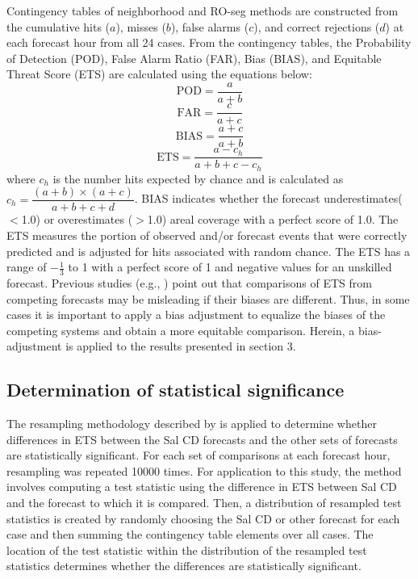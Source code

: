 \documentclass[12pt]{article}
\begin{document}
Contingency tables \citep{wilks11} of neighborhood and RO-seg methods are constructed from the cumulative hits ($a$), misses ($b$), false alarms ($c$), and correct rejections ($d$) at each forecast hour from all 24 cases. From the contingency tables, the Probability of Detection (POD), False Alarm Ratio (FAR), Bias (BIAS), and Equitable Threat Score (ETS) are calculated using the equations below:
\begin{equation}
\text{POD}=\frac{a}{a+b}
\end{equation}
\noindent
\begin{equation}
\text{FAR}=\frac{c}{a+c}
\end{equation}
\begin{equation}
\text{BIAS}=\frac{a+c}{a+b}
\end{equation}
\begin{equation}
\text{ETS}=\frac{a-c_{h}}{a+b+c-c_{h}}
\label{eETS}
\end{equation}
\noindent
where $c_{h}$ is the number hits expected by chance and is calculated as {$c_{h}=\dfrac{(a+b)\times(a+c)}{a+b+c+d}$}. BIAS indicates whether the forecast underestimates($<$1.0) or overestimates ($>$1.0) areal coverage with a perfect score of 1.0. The ETS measures the portion of observed and/or forecast events that were correctly predicted and is adjusted for hits associated with random chance. The ETS has a range of $-\frac{1}{3}$ to 1 with a perfect score of 1 and negative values for an unskilled forecast. Previous studies (e.g., \citealt{hamill99}) point out that comparisons of ETS from competing forecasts may be misleading if their biases are different. Thus, in some cases it is important to apply a bias adjustment to equalize the biases of the competing systems and obtain a more equitable comparison. Herein, a bias-adjustment is applied to the results presented in section 3.

\subsection{Determination of statistical significance}
The resampling methodology described by \citet{hamill99} is applied to determine whether differences in ETS between the Sal CD forecasts and the other sets of forecasts are statistically significant. For each set of comparisons at each forecast hour, resampling was repeated 10000 times. For application to this study, the \citet{hamill99} method involves computing a test statistic using the difference in ETS between Sal CD and the forecast to which it is compared. Then, a distribution of resampled test statistics is created by randomly choosing the Sal CD or other forecast for each case and then summing the contingency table elements over all cases. The location of the test statistic within the distribution of the resampled test statistics determines whether the differences are statistically significant.
\end{document}
